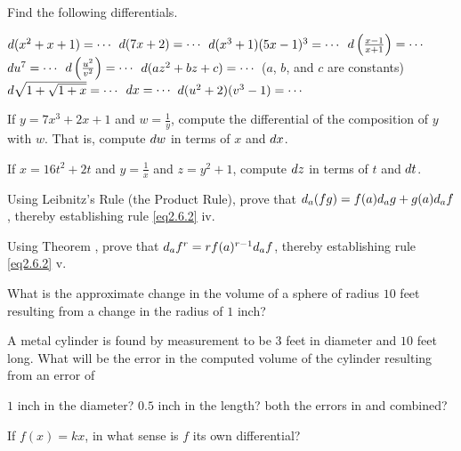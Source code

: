 \begin{exercises}

Find the following differentials.
\begin{exenum}
\sx
$d(x^2 + x + 1) = \cdots$
\sx
$d(7x + 2) = \cdots$
\sx
$d(x^3+1)(5x-1)^3 = \cdots$
\sx
$d\left( \frac{x-1}{x+1} \right) = \cdots$
\sx
$d u^7 = \cdots$
\sx
$d \left( \frac{u^2}{v^2} \right) = \cdots$
\sx
$d(az^2 + bz + c) = \cdots$ ($a$, $b$, and $c$
are constants)
\sx
$d\sqrt{1 + \sqrt{1+x}} = \cdots$
\sx
$d x = \cdots$
\sx
$d (u^2 + 2)(v^3 - 1) = \cdots$
\end{exenum}

If $y = 7x^3 + 2x + 1$ and $w = \frac1y$,
compute the differential of the composition of
$y$ with $w$.  That is, compute $d w$ in terms
of $x$ and $d x$.

If $x = 16t^2 + 2t$ and $y = \frac1x$ and
$z = y^2 + 1$, compute $d z$ in terms of $t$ and $d t$.

Using Leibnitz's Rule (the Product Rule), prove that
$d_a(fg) = f(a)d_ag + g(a)d_af$, thereby establishing
rule \ref{eq2.6.2} iv.

Using Theorem , prove that
$d_af^r = rf(a)^{r-1}d_af$, thereby establishing
rule \ref{eq2.6.2} v.

What is the approximate change in the volume of a sphere
of radius $10$ feet resulting from a change in the radius
of $1$ inch?

A metal cylinder is found by measurement to be $3$ feet in
diameter and $10$ feet long.  What will be the error in the
computed volume of the cylinder resulting from an error of
\begin{exenum}
\sx
{}
$1$ inch in the diameter?
\sx
{}
$0.5$ inch in the length?
\sx
both the errors in  and  combined?
\end{exenum}

If $f(x) = kx$, in what sense is $f$ its own differential?

\end{exercises}
